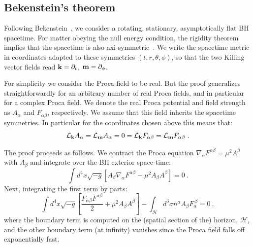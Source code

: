 \subsection{Bekenstein's theorem}
\label{sec_nohair1}
Following Bekenstein~\cite{Bekenstein:1971hc,Bekenstein:1972ky}, we consider a rotating, stationary, asymptotically flat BH spacetime. For matter obeying the null energy condition, the rigidity theorem implies that the spacetime is also axi-symmetric~\cite{Hawking:1971vc}. We write the spacetime metric in coordinates adapted to these symmetries $(t,r,\theta,\phi)$, so that the two Killing vector fields read ${\bf k}=\partial_t$, ${\bf m}=\partial_\phi$.


For simplicity we consider the Proca field to be real. But the proof generalizes straightforwardly for an arbitrary number of real Proca fields, and in particular for a complex Proca field. We denote the real Proca potential and field strength as $A_\alpha$ and $F_{\alpha\beta}$, respectively. We assume that this field inherits the spacetime symmetries. In particular for the coordinates chosen above 
this means that: 
\begin{equation}
\mathcal{L}_{\bf k} A_\alpha=\mathcal{L}_{\bf m} A_\alpha=0=\mathcal{L}_{\bf k} F_{\alpha\beta}=\mathcal{L}_{\bf m} F_{\alpha\beta} \ .
\label{symmetriesaf}
\end{equation}

The proof proceeds as follows. We contract the Proca equation $\nabla_\alpha F^{\alpha\beta}=\mu^2 A^\beta$ with $A_\beta$ and integrate over the BH exterior space-time:
\begin{equation}
\int d^4x\sqrt{-g}\left[A_\beta\nabla_\alpha F^{\alpha\beta}-\mu^2 A_\beta A^\beta\right]=0 \ .
\end{equation}
Next, integrating the first term by parts:
\begin{equation}
\int d^4x\sqrt{-g}\left[\frac{F_{\alpha\beta} F^{\alpha\beta}}{2}+\mu^2 A_\beta A^\beta\right]-\int_{\mathcal{H}}d^3\sigma n^\alpha A_\beta F_{\alpha}^{\ \beta}=0 \ ,
\label{bek1}
\end{equation}
where the boundary term is computed on the (spatial section of the) horizon, $\mathcal{H}$, and the other boundary term (at infinity) vanishes since the Proca field falls off exponentially fast.

